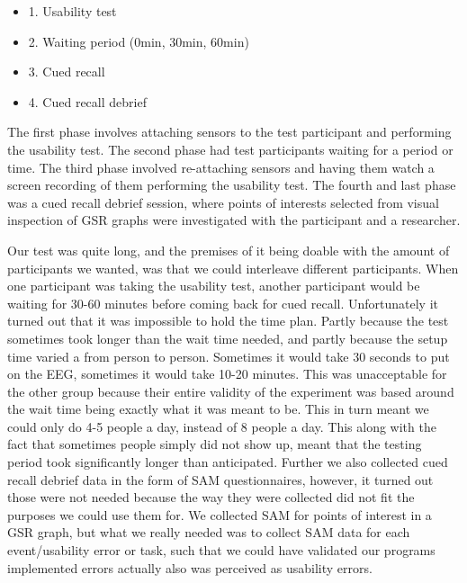 \begin{itemize}
\item 1. Usability test
\item 2. Waiting period (0min, 30min, 60min)
\item 3. Cued recall
\item 4. Cued recall debrief
\end{itemize}

The first phase involves attaching sensors to the test participant and performing the usability test. The second phase
had test participants waiting for a period or time. 
The third phase involved re-attaching sensors and having them watch a screen recording of them performing the usability test.
The fourth and last phase was a cued recall debrief session, where points of interests selected from visual inspection of GSR graphs were investigated with the participant and a researcher.

Our test was quite long, and the premises of it being doable with the amount of participants we wanted, was that we could interleave different participants. 
When one participant was taking the usability test, another participant would be waiting for 30-60 minutes before coming back for cued recall. 
Unfortunately it turned out that it was impossible to hold the time plan. Partly because the test sometimes took longer than the wait time needed, and partly because the setup time varied a from person to person. Sometimes it would take 30 seconds to put on the EEG, sometimes it would take 10-20 minutes. This was unacceptable for the other group because their entire validity of the experiment was based around the wait time being exactly what it was meant to be.
This in turn meant we could only do 4-5 people a day, instead of 8 people a day. 
This along with the fact that sometimes people simply did not show up, meant that the testing period took significantly longer than anticipated. 
Further we also collected cued recall debrief data in the form of SAM questionnaires, however, it turned out those were not needed because the way they were collected did not fit the purposes we could use them for. We collected SAM for points of interest in a GSR graph, but what we really needed was to collect SAM data for each event/usability error or task, such that we could have validated our programs implemented errors actually also was perceived as usability errors. 

